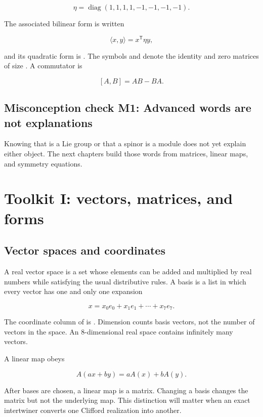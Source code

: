 \documentclass[11pt]{article}
\begin{document}
\[
\eta=\operatorname{diag}(1,1,1,1,-1,-1,-1,-1).
\]

The associated bilinear form is written

\[
\langle x,y\rangle=x^{\mathsf T}\eta y,
\]

and its quadratic form is \texttt{}. The symbols \texttt{} and \texttt{} denote the identity and zero matrices of size \texttt{}. A commutator is

\[
[A,B]=AB-BA.
\]

\subsection{Misconception check M1: Advanced words are not explanations}

Knowing that \texttt{} is a Lie group or that a spinor is a module does not yet explain either object. The next chapters build those words from matrices, linear maps, and symmetry equations.

\section{Toolkit I: vectors, matrices, and forms}

\subsection{Vector spaces and coordinates}

A real vector space is a set whose elements can be added and multiplied by real numbers while satisfying the usual distributive rules. A basis \texttt{} is a list in which every vector has one and only one expansion

\[
x=x_0e_0+x_1e_1+\cdots+x_7e_7.
\]

The coordinate column of \texttt{} is \texttt{}. Dimension counts basis vectors, not the number of vectors in the space. An 8-dimensional real space contains infinitely many vectors.

A linear map \texttt{} obeys

\[
A(ax+by)=aA(x)+bA(y).
\]

After bases are chosen, a linear map is a matrix. Changing a basis changes the matrix but not the underlying map. This distinction will matter when an exact intertwiner converts one Clifford realization into another.
\end{document}
